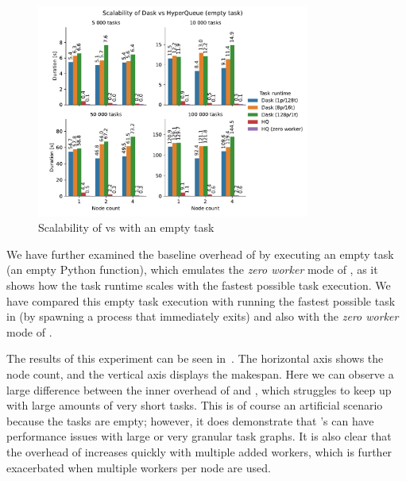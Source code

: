 \begin{figure}[h]
	\centering
	\includegraphics[width=0.8\textwidth]{imgs/hq/charts/dask-vs-hq-empty}
	\caption{Scalability of \hyperqueue{} vs \dask{} with an empty task}
	\label{fig:hq-dask-empty}
\end{figure}

We have further examined the baseline overhead of \dask{} by executing an empty
task (an empty Python function), which emulates the \emph{zero worker} mode of
\hyperqueue{}, as it shows how the task runtime scales with the fastest possible task
execution. We have compared this empty task execution with running the fastest possible task in
\hyperqueue{} (by spawning a process that immediately exits) and also with the \emph{zero worker} mode of \hyperqueue{}.

The results of this experiment can be seen in~. The horizontal axis shows
the node count, and the vertical axis displays the makespan. Here we can observe a large difference
between the inner overhead of \hyperqueue{} and \dask{}, which struggles
to keep up with large amounts of very short tasks. This is of course an artificial scenario because
the tasks are empty; however, it does demonstrate that \dask{}'s can have
performance issues with large or very granular task graphs. It is also clear that the overhead of
\dask{} increases quickly with multiple added workers, which is further exacerbated
when multiple workers per node are used.

